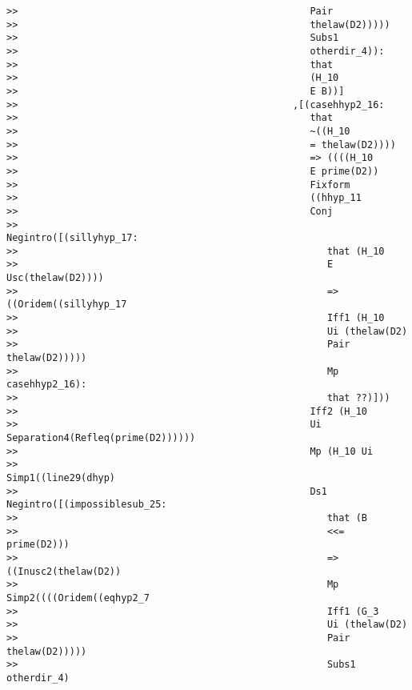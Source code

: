 \documentclass[12pt]{article}
\begin{document}
\begin{verbatim}
>>                                                   Pair
>>                                                   thelaw(D2)))))
>>                                                   Subs1
>>                                                   otherdir_4)):
>>                                                   that
>>                                                   (H_10
>>                                                   E B))]
>>                                                ,[(casehhyp2_16:
>>                                                   that
>>                                                   ~((H_10
>>                                                   = thelaw(D2))))
>>                                                   => ((((H_10
>>                                                   E prime(D2))
>>                                                   Fixform
>>                                                   ((hhyp_11
>>                                                   Conj
>>                                                   Negintro([(sillyhyp_17:
>>                                                      that (H_10
>>                                                      E Usc(thelaw(D2))))
>>                                                      => ((Oridem((sillyhyp_17
>>                                                      Iff1 (H_10
>>                                                      Ui (thelaw(D2)
>>                                                      Pair thelaw(D2)))))
>>                                                      Mp casehhyp2_16):
>>                                                      that ??)]))
>>                                                   Iff2 (H_10
>>                                                   Ui Separation4(Refleq(prime(D2))))))
>>                                                   Mp (H_10 Ui
>>                                                   Simp1((line29(dhyp)
>>                                                   Ds1 Negintro([(impossiblesub_25:
>>                                                      that (B
>>                                                      <<= prime(D2)))
>>                                                      => ((Inusc2(thelaw(D2))
>>                                                      Mp Simp2((((Oridem((eqhyp2_7
>>                                                      Iff1 (G_3
>>                                                      Ui (thelaw(D2)
>>                                                      Pair thelaw(D2)))))
>>                                                      Subs1 otherdir_4)

\end{verbatim}
\end{document}
